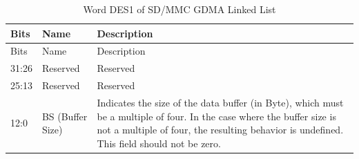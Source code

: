 
\begin{longtable}[c]{ |p{3cm}|p{4cm}|p{8cm}| }
\caption{Word DES1 of SD/MMC GDMA Linked List} \label{tab:sdhost-DES1}\\
\hline
\rowcolor{lightgray}
Bits &Name & Description \\
\hline
\endfirsthead
\hline
\rowcolor{lightgray}
Bits &Name & Description  \\
\hline
\endhead
\endfoot

31:26 & Reserved& Reserved  \\\hline
25:13 & Reserved& Reserved  \\\hline
\multirow{4}{*}{12:0}  & \multirow{4}{*}{BS (Buffer Size)} &  Indicates the size of the data buffer (in Byte), which must be a multiple of four. In the case where the buffer size is not a multiple of four, the resulting behavior is undefined. This field should not be zero.    \\\hline

\end{longtable}
